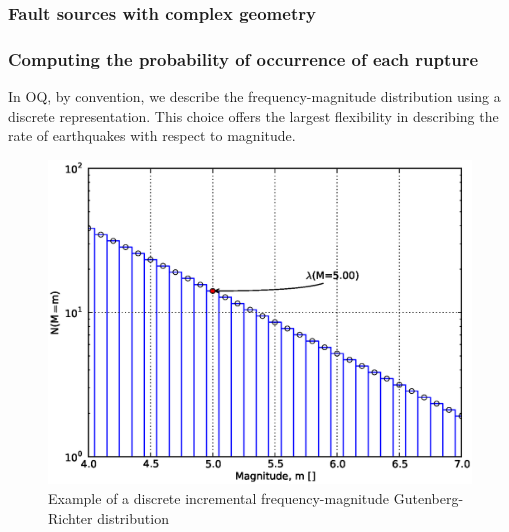 %
\subsubsection{Fault sources with complex geometry}

%
\subsubsection{Computing the probability of occurrence of each rupture}
In OQ, by convention, we describe the frequency-magnitude distribution using 
a discrete representation. 
This choice offers the largest flexibility in describing the rate of 
earthquakes with respect to magnitude. 
%
\begin{figure}[!ht]
\includegraphics[width=15cm]{./Figures/Part_Hazard/gr_example.eps}
\caption{Example of a discrete incremental frequency-magnitude Gutenberg-Richter distribution}
\label{fig:gr-example}
\end{figure}
%

